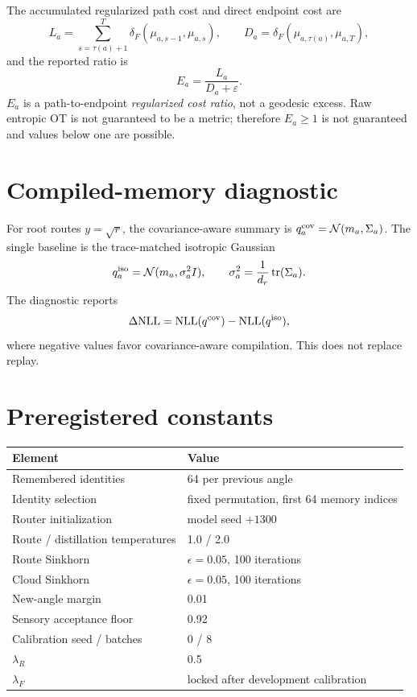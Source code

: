 \documentclass[11pt]{article}
\begin{document}
The accumulated regularized path cost and direct endpoint cost are
\[
L_a=\sum_{s=\tau(a)+1}^{T}\delta_F(\mu_{a,s-1},\mu_{a,s}),\qquad
D_a=\delta_F(\mu_{a,\tau(a)},\mu_{a,T}),
\]
and the reported ratio is
\[
E_a=\frac{L_a}{D_a+\varepsilon}.
\]
$E_a$ is a path-to-endpoint \emph{regularized cost ratio}, not a geodesic excess. Raw entropic OT is not guaranteed to be a metric; therefore $E_a\ge1$ is not guaranteed and values below one are possible.

\section{Compiled-memory diagnostic}
For root routes $y=\sqrt r$, the covariance-aware summary is $q_a^{\rm cov}=\mathcal N(m_a,\Sigma_a)$. The single baseline is the trace-matched isotropic Gaussian
\[
q_a^{\rm iso}=\mathcal N(m_a,\sigma_a^2I),\qquad \sigma_a^2=\frac{1}{d_r}\operatorname{tr}(\Sigma_a).
\]
The diagnostic reports
\[
\Delta\mathrm{NLL}=\mathrm{NLL}(q^{\rm cov})-\mathrm{NLL}(q^{\rm iso}),
\]
where negative values favor covariance-aware compilation. This does not replace replay.

\section{Preregistered constants}
\begin{center}
\begin{tabular}{ll}
\toprule
Element & Value\\
\midrule
Remembered identities & 64 per previous angle\\
Identity selection & fixed permutation, first 64 memory indices\\
Router initialization & model seed $+1300$\\
Route / distillation temperatures & 1.0 / 2.0\\
Route Sinkhorn & $\epsilon=0.05$, 100 iterations\\
Cloud Sinkhorn & $\epsilon=0.05$, 100 iterations\\
New-angle margin & 0.01\\
Sensory acceptance floor & 0.92\\
Calibration seed / batches & 0 / 8\\
$\lambda_R$ & 0.5\\
$\lambda_F$ & locked after development calibration\\
\bottomrule
\end{tabular}
\end{center}
\end{document}

